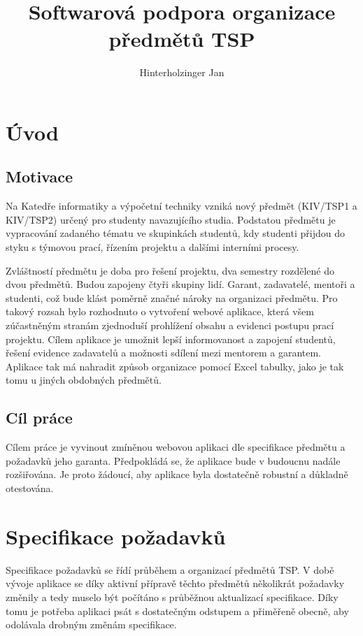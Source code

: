 \documentclass[czech,BP]{thesiskiv}
\author{Hinterholzinger Jan}
\title{Softwarová podpora organizace předmětů TSP}
\begin{document}
%
\maketitle
\tableofcontents
\chapter{Úvod}
\section{Motivace}
	\par Na Katedře informatiky a výpočetní techniky vzniká nový předmět  (KIV/TSP1 a KIV/TSP2) určený pro studenty navazujícího studia. Podstatou předmětu je vypracování zadaného tématu ve skupinkách studentů, kdy studenti přijdou do styku s týmovou prací, řízením projektu a dalšími interními procesy.
	\par Zvláštností předmětu je doba pro řešení projektu, dva semestry rozdělené do dvou předmětů. Budou zapojeny čtyři skupiny lidí. Garant, zadavatelé, mentoři a studenti, což bude klást poměrně značné nároky na organizaci předmětu. Pro takový rozsah bylo rozhodnuto o vytvoření webové aplikace, která všem zúčastněným stranám zjednoduší prohlížení obsahu a evidenci postupu prací projektu. Cílem aplikace je umožnit lepší informovanost a zapojení studentů, řešení evidence zadavatelů a možnosti sdílení mezi mentorem a garantem. Aplikace tak má nahradit způsob organizace pomocí Excel tabulky, jako je tak tomu u jiných obdobných předmětů.
\section{Cíl práce}
	\par Cílem práce je vyvinout zmíněnou webovou aplikaci dle specifikace předmětu a požadavků jeho garanta. Předpokládá se, že aplikace bude v budoucnu nadále rozšiřována. Je proto žádoucí, aby aplikace byla dostatečně robustní a důkladně otestována.
\chapter{Specifikace požadavků}
\par Specifikace požadavků se řídí průběhem a organizací předmětů TSP. V době vývoje aplikace se díky aktivní přípravě těchto předmětů několikrát požadavky změnily a tedy muselo být počítáno s průběžnou aktualizací specifikace. Díky tomu je potřeba aplikaci psát s dostatečným odstupem a přiměřeně obecně, aby odolávala drobným změnám specifikace.
\end{document}
